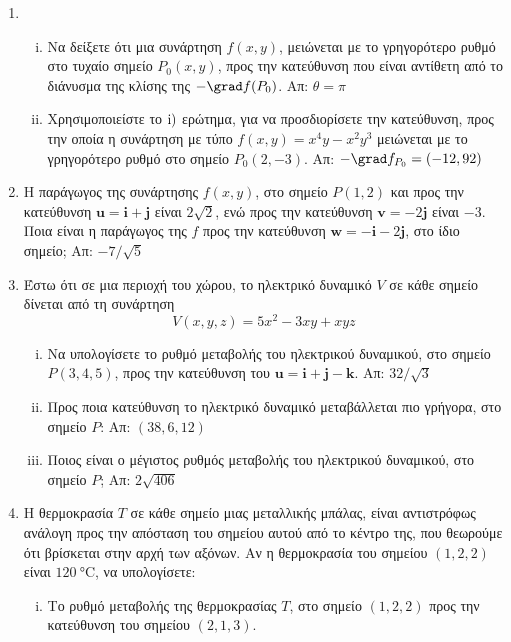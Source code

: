 \begin{enumerate}
  \item 
    \begin{enumerate}[i)]
      \item Να δείξετε ότι μια συνάρτηση $ f(x,y) $, μειώνεται με το γρηγορότερο ρυθμό
        στο τυχαίο σημείο $ P_{0}(x,y) $, προς την κατεύθυνση που είναι αντίθετη από το 
        διάνυσμα της κλίσης της $ - \grad f(P_{0}) $.
        \hfill Απ: $ \theta = \pi $  
      \item Χρησιμοποιείστε το $ \rm{i)} $ ερώτημα, για να προσδιορίσετε την κατεύθυνση,
        προς την οποία η συνάρτηση με τύπο $ f(x,y) = x^{4}y-x^{2}y^{3} $ μειώνεται με 
        το γρηγορότερο ρυθμό στο σημείο $ P_{0}(2,-3) $. 
        \hfill Απ: $ - \grad f_{P_{0}} = (-12,92) $
    \end{enumerate}

  \item Η παράγωγος της συνάρτησης $ f(x,y) $, στο σημείο $ P(1,2) $ και προς την 
    κατεύθυνση $ \mathbf{u} = \mathbf{i} + \mathbf{j} $ είναι $ 2 \sqrt{2} $, ενώ 
    προς την κατεύθυνση $ \mathbf{v} = -2 \mathbf{j} $ είναι $ -3 $. Ποια είναι 
    η παράγωγος της $f$ προς την κατεύθυνση $ \mathbf{w} = - \mathbf{i}- 2\mathbf{j} $, 
    στο ίδιο σημείο; \hfill Απ: $ -7/ \sqrt{5} $

  \item Έστω ότι σε μια περιοχή του χώρου, το ηλεκτρικό δυναμικό $V$ σε κάθε σημείο 
    δίνεται από τη συνάρτηση \[ V(x,y,z) = 5x^{2}-3xy+xyz \] 
    \begin{enumerate}[i) ]
      \item Να υπολογίσετε το ρυθμό μεταβολής του ηλεκτρικού δυναμικού, στο σημείο 
        $ P(3,4,5) $, προς την κατεύθυνση του $ \mathbf{u} = \mathbf{i} + \mathbf{j} - 
        \mathbf{k} $. \hfill Απ: $ 32 / \sqrt{3} $  

      \item Προς ποια κατεύθυνση το ηλεκτρικό δυναμικό μεταβάλλεται πιο γρήγορα, στο 
        σημείο $ P $: \hfill Απ: $ (38,6,12) $ 
      \item Ποιος είναι ο μέγιστος ρυθμός μεταβολής του ηλεκτρικού δυναμικού, στο σημείο 
        $ P $; \hfill Απ: $ 2 \sqrt{406} $ 
    \end{enumerate}

  \item Η θερμοκρασία $T$ σε κάθε σημείο μιας μεταλλικής μπάλας, είναι αντιστρόφως 
    ανάλογη προς την απόσταση του σημείου αυτού από το κέντρο της, που θεωρούμε ότι 
    βρίσκεται στην αρχή των αξόνων. Αν η θερμοκρασία του σημείου $ (1,2,2) $ είναι 
    $ \SI{120}{\celsius} $, να υπολογίσετε:
    \begin{enumerate}[i)]
      \item Το ρυθμό μεταβολής της θερμοκρασίας $T$, στο σημείο $ (1,2,2) $ προς την 
        κατεύθυνση του σημείου $ (2,1,3) $. 


\end{enumerate}
\end{enumerate}
